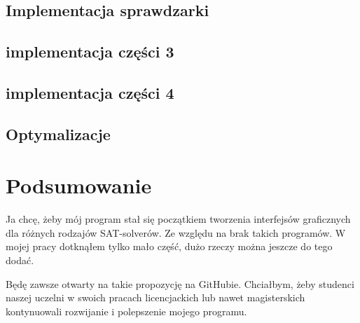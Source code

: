 \documentclass[a4paper,12pt,oneside]{book}
\theoremstyle{definition}
\begin{document}
\lipsum[2]

\lipsum[3]

\section{Implementacja sprawdzarki}

\lipsum[1]

\lipsum[2]

\lipsum[3]

\section{implementacja  części 3}

\lipsum[1]

\lipsum[2]

\lipsum[3]

\section{implementacja  części 4}

\lipsum[1]

\lipsum[2]

\lipsum[3]

\section{Optymalizacje}

\lipsum[1]

\lipsum[2]

\lipsum[3]

\lipsum[4]

\chapter*{Podsumowanie}

Ja chcę, żeby mój program stał się początkiem tworzenia interfejsów graficznych dla różnych rodzajów SAT-solverów. Ze względu na brak takich programów. W mojej pracy dotknąłem tylko mało część, dużo rzeczy można jeszcze do tego dodać.

Będę \cite{einstein} zawsze otwarty na takie propozycję na GitHubie. Chciałbym, żeby \cite{dirac} studenci naszej uczelni w \cite{dirac} swoich pracach licencjackich lub \cite{knuthwebsite} nawet magisterskich \cite{knuth-fa} kontynuowali rozwijanie i polepszenie mojego programu.

\printbibliography[title=Bibliografia]

\end{document}
